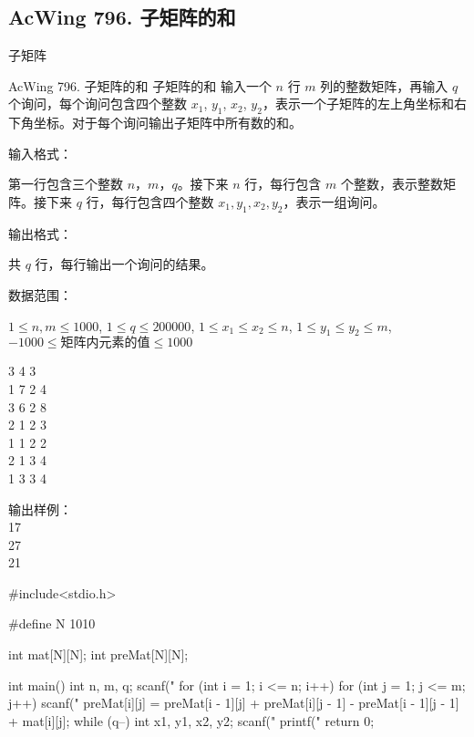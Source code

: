\subsection{AcWing 796. 子矩阵的和}
子矩阵
\begin{problembox}{AcWing 796. 子矩阵的和}
    \small{子矩阵的和}
    输入一个 $n$ 行 $m$ 列的整数矩阵，再输入 $q$ 个询问，每个询问包含四个整数 $x_1$, $y_1$, $x_2$, $y_2$，表示一个子矩阵的左上角坐标和右下角坐标。对于每个询问输出子矩阵中所有数的和。

    输入格式：

    第一行包含三个整数 $n$，$m$，$q$。接下来 $n$ 行，每行包含 $m$ 个整数，表示整数矩阵。接下来 $q$ 行，每行包含四个整数 $x_1, y_1, x_2, y_2$，表示一组询问。

    输出格式：

    共 $q$ 行，每行输出一个询问的结果。

    数据范围：

    $1 \le n,m \le 1000$,
    $1 \le q \le 200000$,
    $1 \le x_1 \le x_2 \le n$,
    $1 \le y_1 \le y_2 \le m$,
    $-1000 \le 矩阵内元素的值 \le 1000$

    \begin{inputblock}
        3 4 3 \\
        1 7 2 4 \\
        3 6 2 8 \\
        2 1 2 3 \\
        1 1 2 2 \\
        2 1 3 4\\
        1 3 3 4
    \end{inputblock}%
    \begin{minipage}[t]{.5\textwidth}
        输出样例：\\
        17 \\
        27 \\
        21
    \end{minipage}
\end{problembox}

\begin{mycpponecol}[子矩阵的和]
    #include<stdio.h>

    #define N 1010

    int mat[N][N];
    int preMat[N][N];

    int main()
        {
        int n, m, q;
        scanf("%
        for (int i = 1; i <= n; i++) {
            for (int j = 1; j <= m; j++) {
                scanf("%
                preMat[i][j] = preMat[i - 1][j] + preMat[i][j - 1] - preMat[i - 1][j - 1] + mat[i][j];
            }
        }
        while (q--) {
            int x1, y1, x2, y2;
            scanf("%
            printf("%
        }
        return 0;
    }
\end{mycpponecol}

